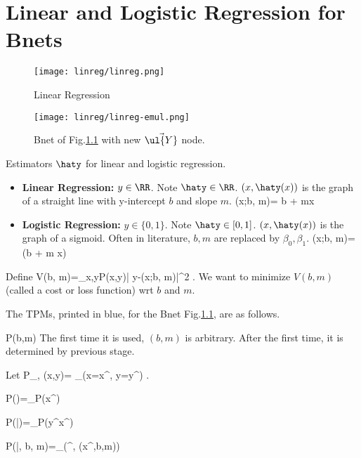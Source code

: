 \chapter{Linear and Logistic Regression for Bnets}
\label{ch-linear-reg-bnets}

\begin{figure}[h!]
\centering
\texttt{[image: linreg/linreg.png]}
\caption{Linear Regression}
\label{fig-linreg}
\end{figure}

\begin{figure}[h!]
\centering
\texttt{[image: linreg/linreg-emul.png]}
\caption{Bnet of Fig.\ref{fig-linreg}  with new $\vec{\ul{Y}}$ node.}\label{fig-linreg-emul}
\end{figure}



Estimators $\haty$ for linear and logistic regression.
\begin{itemize}
\item

\textbf{Linear Regression:} $y\in \RR$.
Note $\haty\in \RR$. $(x,\haty(x))$ is
the graph
of a straight line
with y-intercept $b$ and slope $m$.
\beq
\haty(x;b, m)= b + mx
\eeq

\item
\textbf{Logistic Regression:} $y\in\{0, 1\}$. Note $\haty\in [0,1]$. $
(x,\haty(x))$ is the graph
of a sigmoid.
 Often in literature, $b,m$ are replaced by $\beta_0, \beta_1$.
\beq
\haty(x;b, m)=\smoid(b + m x)
\eeq
\end{itemize}

Define
\beq
V(b, m)=\sum_{x,y}P(x,y)| y-\haty(x;b, m)|^2
\;.\label{eq-norm-cost}
\eeq
We want to minimize $V(b,m)$ (called a cost or loss function) wrt $b$ and $m$.


The TPMs, printed in blue, for the
Bnet Fig.\ref{fig-linreg}, are as follows.

\beq\color{blue}
P(b,m) 
\eeq
The first time it is used,
$(b,m)$ is arbitrary.
After the first time, it is determined
by previous stage.

Let
\beq
P_{\rvx, \rvy}(x,y)=
\sum_\s \indi(x=x^\s, y=y^\s)
\;.
\eeq

\beq\color{blue}
P(\vecx)=\prod_\s P(x^\s)
\eeq

\beq\color{blue}
P(\vecy|\vecx)=\prod_\s P(y^\s\cond x^\s)
\eeq

\beq\color{blue}
P(\vec{\haty}|\vecx, b, m)=\prod_\s \delta(\haty^\s, \haty(x^\s,b,m))
\label{eq-replace1}
\eeq

